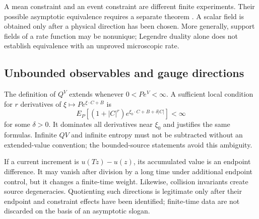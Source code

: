 A mean constraint and an event constraint are different finite experiments. Their possible asymptotic equivalence requires a separate theorem \cite{ChetriteTouchette}. A scalar field is obtained only after a physical direction has been chosen. More generally, support fields of a rate function may be nonunique; Legendre duality alone does not establish equivalence with an unproved microscopic rate.

\subsection{Unbounded observables and gauge directions}
The definition of $Q^V$ extends whenever $0<Pe^V<\infty$. A sufficient local condition for $r$ derivatives of $\xi\mapsto Pe^{\xi\cdot C+B}$ is
\[
 E_P[(1+|C|^r)e^{\xi_0\cdot C+B+\delta|C|}]<\infty
\]
for some $\delta>0$. It dominates all derivatives near $\xi_0$ and justifies the same formulas. Infinite $QV$ and infinite entropy must not be subtracted without an extended-value convention; the bounded-source statements avoid this ambiguity.

If a current increment is $u(Tz)-u(z)$, its accumulated value is an endpoint difference. It may vanish after division by a long time under additional endpoint control, but it changes a finite-time weight. Likewise, collision invariants create source degeneracies. Quotienting such directions is legitimate only after their endpoint and constraint effects have been identified; finite-time data are not discarded on the basis of an asymptotic slogan.
\par
